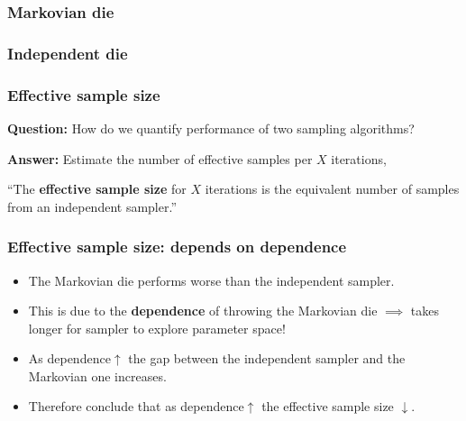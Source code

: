 \documentclass[handout]{beamer}
\begin{document}
\begin{frame}
	\frametitle{Markovian die}
	
	\begin{figure}[t]
		\centerline{}
	\end{figure}
	
\end{frame}

\begin{frame}
	\frametitle{Independent die}
	
	\begin{figure}[t]
		\centerline{}
	\end{figure}
	
\end{frame}

\begin{frame}
	\frametitle{Effective sample size}
	\textbf{Question:} How do we quantify performance of two sampling algorithms?
	
	\vspace{0.2cm}
	
	 \textbf{Answer:} Estimate the number of effective samples per $X$ iterations,
	
	 ``The \textbf{effective sample size} for $X$ iterations is the equivalent number of samples from an independent sampler.''  
	
\end{frame}

\begin{frame}
	\frametitle{Effective sample size: depends on dependence}
	\begin{itemize}
		\item<2-> The Markovian die performs worse than the independent sampler.
		\item<3-> This is due to the \textbf{dependence} of throwing the Markovian die \onslide<4-> $\implies$ takes longer for sampler to explore parameter space!
		\item<5-> As dependence$\uparrow$ the gap between the independent sampler and the Markovian one increases.
		\item<6-> Therefore conclude that as dependence$\uparrow$ the effective sample size $\downarrow$.
	\end{itemize}
	
\end{frame}
\end{document}
